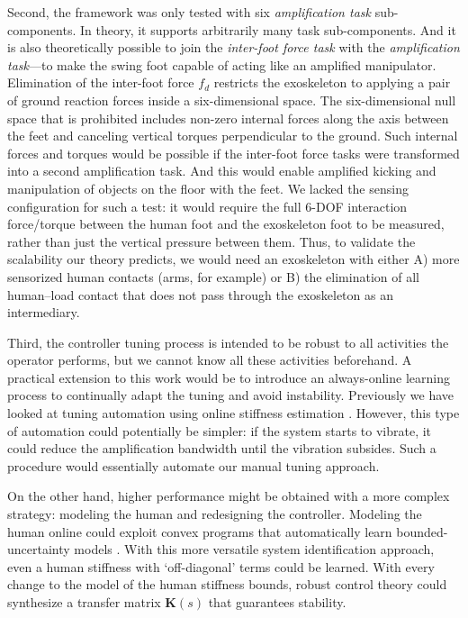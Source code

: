 \documentclass[utf8]{frontiersSCNS}
\renewcommand*{\cite}[1]{\citep{#1}}
\newcommand{\add}[1]{\textcolor[HTML]{8710b3}{#1}}
\begin{document}
Second, the framework was only tested with six \emph{amplification task} sub-components.
In theory, it supports arbitrarily many task sub-components.
And it is also theoretically possible to join the \emph{inter-foot force task} with the \emph{amplification task}---to make the swing foot capable of acting like an amplified manipulator.
\add{Elimination of the inter-foot force $f_d$ restricts the exoskeleton to applying a pair of ground reaction forces inside a six-dimensional space. The six-dimensional null space that is prohibited includes non-zero internal forces along the axis between the feet and canceling vertical torques perpendicular to the ground. Such internal forces and torques \cite{SentisParkKhatib2010TRO} would be possible if the inter-foot force tasks were transformed into a second amplification task. And this would enable amplified kicking and manipulation of objects on the floor with the feet.}
We lacked the sensing configuration for such a test: it would require the full 6-DOF interaction force/torque between the human foot and the exoskeleton foot to be measured, rather than just the vertical pressure between them.
Thus, to validate the scalability our theory predicts, we would need an exoskeleton with either A) more sensorized human contacts (arms, for example) or B) the elimination of all human--load contact that does not pass through the exoskeleton as an intermediary.



Third, the controller tuning process is intended to be robust to all activities the operator performs, but we cannot know all these activities beforehand.
A practical extension to this work would be to introduce an always-online learning process to continually adapt the tuning and avoid instability.
Previously we have looked at tuning automation using online stiffness estimation \cite{HuangCappelThomasHeSentis2020ACC}.
However, this type of automation could potentially be simpler: if the system starts to vibrate, it could reduce the amplification bandwidth until the vibration subsides.
\add{Such a procedure would essentially automate our manual tuning approach.}

On the other hand, higher performance might be obtained with a more complex strategy: modeling the human and redesigning the controller.
Modeling the human online could \add{exploit} convex programs that automatically learn bounded-uncertainty models \cite{ThomasSentis2019TAC}. 
With this more versatile system identification approach, even a human stiffness with `off-diagonal' terms could be learned.
With every change to the model of the human stiffness bounds, robust control theory could synthesize a transfer matrix $\mathbf K(s)$ that guarantees stability.
\end{document}
